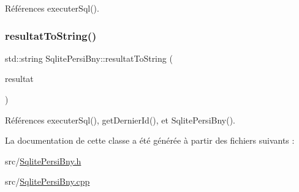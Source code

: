 Références executer\+Sql().

\mbox{\label{classSqlitePersiBny_a6c80449c682a18e9e9ce0a860f05088d}} 
\subsubsection{\texorpdfstring{resultat\+To\+String()}{resultatToString()}}
{\footnotesize\ttfamily std\+::string Sqlite\+Persi\+Bny\+::resultat\+To\+String (\begin{DoxyParamCaption}\item[{\hyperlink{classSqlitePersiBny_a04bdd1bacd9241210ea44ec2c072f79b}{Sqlite\+Persi\+Bny\+::\+Resultat} \&}]{resultat }\end{DoxyParamCaption})\hspace{0.3cm}{\ttfamily [static]}}



Références executer\+Sql(), get\+Dernier\+Id(), et Sqlite\+Persi\+Bny().



La documentation de cette classe a été générée à partir des fichiers suivants \+:\begin{DoxyCompactItemize}
\item 
src/\hyperlink{SqlitePersiBny_8h}{Sqlite\+Persi\+Bny.\+h}\item 
src/\hyperlink{SqlitePersiBny_8cpp}{Sqlite\+Persi\+Bny.\+cpp}\end{DoxyCompactItemize}
